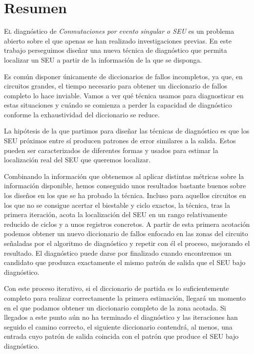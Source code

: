 \chapter*{Resumen}
\pagestyle{especial}
{}

\lettrine[lraise=-0.1, lines=2, loversize=0.2]{E}{l} diagnóstico de
\textit{Conmutaciones por evento singular o \gls{SEU}} es un problema abierto 
sobre el que apenas se han realizado investigaciones previas. En este trabajo 
perseguimos diseñar una nueva técnica de diagnóstico que permita localizar un 
\gls{SEU} a partir de la información de la que se disponga.

Es común disponer únicamente de diccionarios de fallos incompletos, ya que, en
circuitos grandes, el tiempo necesario para obtener un diccionario de fallos
completo lo hace inviable. Vamos a ver qué técnica usamos para diagnosticar en
estas situaciones y cuándo se comienza a perder la capacidad de diagnóstico
conforme la exhaustividad del diccionario se reduce.

La hipótesis de la que partimos para diseñar las técnicas de diagnóstico es que
los \gls{SEU} próximos entre sí producen patrones de error similares a la salida. 
Estos pueden ser caracterizados de diferentes formas y usados para estimar la
localización real del \gls{SEU} que queremos localizar.

Combinando la información que obtenemos al aplicar distintas métricas sobre la
información disponible, hemos conseguido unos resultados bastante buenos sobre los
diseños en los que se ha probado la técnica. Incluso para aquellos circuitos en
los que no se consigue acertar el biestable y ciclo exactos, la técnica, tras la
primera iteración, acota la localización del \gls{SEU} en un rango relativamente 
reducido de ciclos y a unos registros concretos. A partir de esta primera
acotación podemos obtener un nuevo diccionario de fallos enfocado en las zonas del
circuito señaladas por el algoritmo de diagnóstico y repetir con él el proceso,
mejorando el resultado. El diagnóstico puede darse por finalizado cuando
encontremos un candidato que produzca exactamente el mismo patrón de salida que
el \gls{SEU} bajo diagnóstico.

Con este proceso iterativo, si el diccionario de partida es lo suficientemente
completo para realizar correctamente la primera estimación, llegará un momento en
el que podamos obtener un diccionario completo de la zona acotada. Si llegados a
este punto aún no ha terminado el diagnóstico y las iteraciones han seguido el 
camino correcto, el siguiente diccionario contendrá, al menos, una entrada cuyo 
patrón de salida coincida con el patrón que produce el \gls{SEU} bajo diagnóstico.

